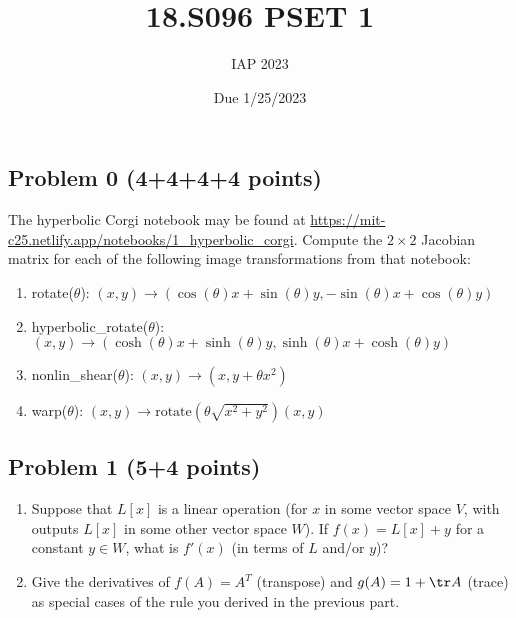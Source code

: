 \documentclass{article}
\title{18.S096 PSET 1}
\author{IAP 2023}
\date{Due 1/25/2023}
\begin{document}
\maketitle

\subsection*{Problem 0 (4+4+4+4 points)}

The hyperbolic Corgi notebook may be found at 
\url{https://mit-c25.netlify.app/notebooks/1_hyperbolic_corgi}. 
Compute the $2 \times 2$ Jacobian matrix for each of the following image
transformations from that notebook:

\begin{enumerate}[label=(\alph*)]

\item rotate($\theta$):
$(x,y)\rightarrow 
(\cos(\theta)x + \sin(\theta)y, -\sin(\theta)x + \cos(\theta)y)$

\item hyperbolic\_rotate($\theta$): $(x,y)\rightarrow(\cosh(\theta)x+\sinh(\theta)y,\sinh(\theta)x + \cosh(\theta)y )$

\item nonlin\_shear($\theta$):
$(x, y) \rightarrow (x, y + \theta x^2)$

\item warp($\theta$):
$ (x, y) \rightarrow  \mbox{rotate}(\theta \sqrt{x^2+y^2})(x, y)$

\end{enumerate}


\subsection*{Problem 1 (5+4 points)}


\begin{enumerate}[label=(\alph*)]

\item Suppose that $L[x]$ is a linear operation (for $x$ in some vector space $V$, with outputs $L[x]$ in some other vector space $W$).   If $f(x) = L[x] + y$ for a constant $y \in W$, what is $f'(x)$ (in terms of $L$ and/or $y$)?

\item Give the derivatives of $f(A) = A^T$ (transpose) and $g(A) = 1 + \tr A$ (trace) as special cases of the rule you derived in the previous part. 

\end{enumerate}
\end{document}
